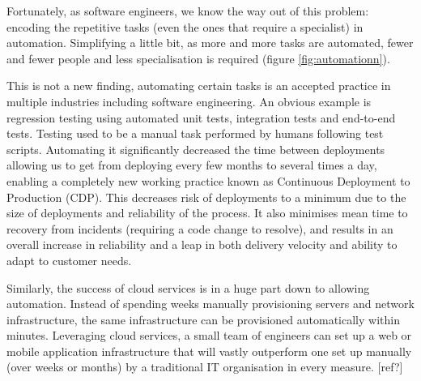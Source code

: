 \documentclass[reprint,amsmath,amssymb,aps]{revtex4-1}
\begin{document}
Fortunately, as software engineers, we know the way out of this problem: encoding the repetitive tasks (even the ones that require a specialist) in automation. Simplifying a little bit, as more and more tasks are automated, fewer and fewer people and less specialisation is required (figure \ref{fig:automationn}).

This is not a new finding, automating certain tasks is an accepted practice in multiple industries including software engineering. An obvious example is regression testing using automated unit tests, integration tests and end-to-end tests. Testing used to be a manual task performed by humans following test scripts. Automating it significantly decreased the time between deployments allowing us to get from deploying every few months to several times a day, enabling a completely new working practice known as Continuous Deployment to Production (CDP). This decreases risk of deployments to a minimum due to the size of deployments and reliability of the process. It also minimises mean time to recovery from incidents (requiring a code change to resolve), and results in an overall increase in reliability and a leap in both delivery velocity and ability to adapt to customer needs.

Similarly, the success of cloud services is in a huge part down to allowing automation. Instead of spending weeks manually provisioning servers and network infrastructure, the same infrastructure can be provisioned automatically within minutes. Leveraging cloud services, a small team of engineers can set up a web or mobile application infrastructure that will vastly outperform one set up manually (over weeks or months) by a traditional IT organisation in every measure. [ref?]
\end{document}
